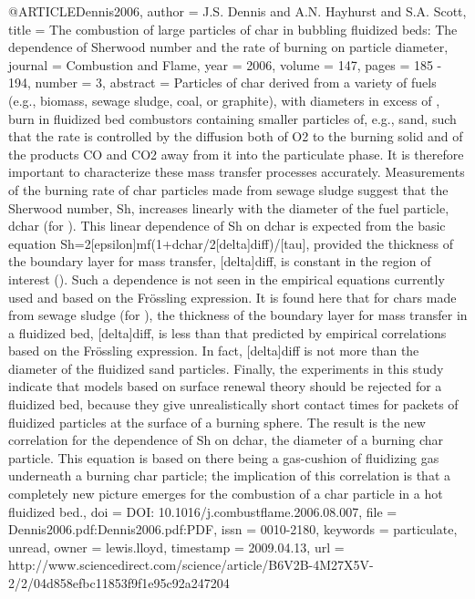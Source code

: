 {@ARTICLE{Dennis2006,
  author = {J.S. Dennis and A.N. Hayhurst and S.A. Scott},
  title = {The combustion of large particles of char in bubbling fluidized beds:
	The dependence of Sherwood number and the rate of burning on particle
	diameter},
  journal = {Combustion and Flame},
  year = {2006},
  volume = {147},
  pages = {185 - 194},
  number = {3},
  abstract = {Particles of char derived from a variety of fuels (e.g., biomass,
	sewage sludge, coal, or graphite), with diameters in excess of ,
	burn in fluidized bed combustors containing smaller particles of,
	e.g., sand, such that the rate is controlled by the diffusion both
	of O2 to the burning solid and of the products CO and CO2 away from
	it into the particulate phase. It is therefore important to characterize
	these mass transfer processes accurately. Measurements of the burning
	rate of char particles made from sewage sludge suggest that the Sherwood
	number, Sh, increases linearly with the diameter of the fuel particle,
	dchar (for ). This linear dependence of Sh on dchar is expected from
	the basic equation Sh=2[epsilon]mf(1+dchar/2[delta]diff)/[tau], provided
	the thickness of the boundary layer for mass transfer, [delta]diff,
	is constant in the region of interest (). Such a dependence is not
	seen in the empirical equations currently used and based on the Frössling
	expression. It is found here that for chars made from sewage sludge
	(for ), the thickness of the boundary layer for mass transfer in
	a fluidized bed, [delta]diff, is less than that predicted by empirical
	correlations based on the Frössling expression. In fact, [delta]diff
	is not more than the diameter of the fluidized sand particles. Finally,
	the experiments in this study indicate that models based on surface
	renewal theory should be rejected for a fluidized bed, because they
	give unrealistically short contact times for packets of fluidized
	particles at the surface of a burning sphere. The result is the new
	correlation for the dependence of Sh on dchar, the diameter of a
	burning char particle. This equation is based on there being a gas-cushion
	of fluidizing gas underneath a burning char particle; the implication
	of this correlation is that a completely new picture emerges for
	the combustion of a char particle in a hot fluidized bed.},
  doi = {DOI: 10.1016/j.combustflame.2006.08.007},
  file = {Dennis2006.pdf:Dennis2006.pdf:PDF},
  issn = {0010-2180},
  keywords = {particulate, unread},
  owner = {lewis.lloyd},
  timestamp = {2009.04.13},
  url = {http://www.sciencedirect.com/science/article/B6V2B-4M27X5V-2/2/04d858efbc11853f9f1e95c92a247204}
}

}
